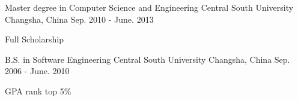 

\begin{cventries}

  \cventry
    {Master degree in Computer Science and Engineering} %
    {Central South University} %
    {Changsha, China} %
    {Sep. 2010 - June. 2013} %
    {
      \begin{cvitems} %
        \item {Full Scholarship}
      \end{cvitems}
    }
  \cventry
    {B.S. in Software Engineering} %
    {Central South University} %
    {Changsha, China} %
    {Sep. 2006 - June. 2010} %
    {
      \begin{cvitems} %
        \item {GPA rank top 5\%}
      \end{cvitems}
    }
\end{cventries}
